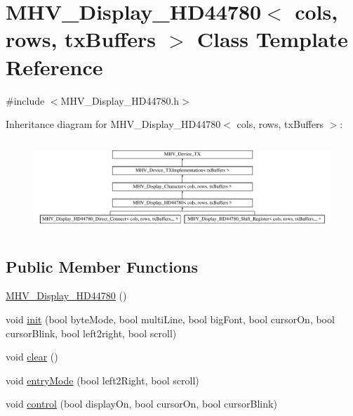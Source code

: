 \hypertarget{class_m_h_v___display___h_d44780}{\section{M\-H\-V\-\_\-\-Display\-\_\-\-H\-D44780$<$ cols, rows, tx\-Buffers $>$ Class Template Reference}
\label{class_m_h_v___display___h_d44780}
}


{\ttfamily \#include $<$M\-H\-V\-\_\-\-Display\-\_\-\-H\-D44780.\-h$>$}

Inheritance diagram for M\-H\-V\-\_\-\-Display\-\_\-\-H\-D44780$<$ cols, rows, tx\-Buffers $>$\-:\begin{figure}[H]
\begin{center}
\leavevmode
\includegraphics[height=3.439803cm]{class_m_h_v___display___h_d44780}
\end{center}
\end{figure}
\subsection*{Public Member Functions}
\begin{DoxyCompactItemize}
\item 
\hyperlink{class_m_h_v___display___h_d44780_a395f663fa827b4f75df52b6f330d9045}{M\-H\-V\-\_\-\-Display\-\_\-\-H\-D44780} ()
\item 
void \hyperlink{class_m_h_v___display___h_d44780_af00d755ba1f94efe7cdead10fb1bef80}{init} (bool byte\-Mode, bool multi\-Line, bool big\-Font, bool cursor\-On, bool cursor\-Blink, bool left2right, bool scroll)
\item 
void \hyperlink{class_m_h_v___display___h_d44780_a06267ed2dd3fecdf7d1b6daa7d495218}{clear} ()
\item 
void \hyperlink{class_m_h_v___display___h_d44780_a725199920a6371b51bac32f2226b33d3}{entry\-Mode} (bool left2\-Right, bool scroll)
\item 
void \hyperlink{class_m_h_v___display___h_d44780_af1dea5bb05b1b4999a4c4240b89b671f}{control} (bool display\-On, bool cursor\-On, bool cursor\-Blink)
\end{DoxyCompactItemize}
